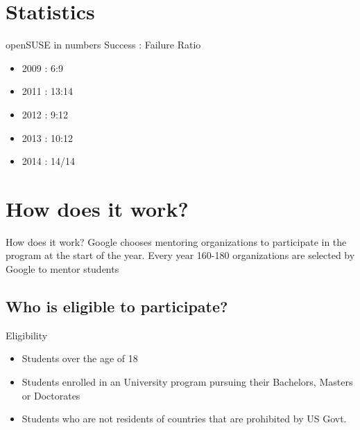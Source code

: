 \documentclass{beamer}
\begin{document}
\section{Statistics}
\begin{frame}{openSUSE in numbers}
Success : Failure Ratio
\begin{itemize}
\pause
\item 2009 : 6:9
\item 2011 : 13:14
\item 2012 : 9:12
\item 2013 : 10:12
\item 2014 : 14/14
\end{itemize}
\end{frame}

\section{How does it work?}
\begin{frame}{How does it work?}
\pause
Google chooses mentoring organizations to participate in the program at the start of the year. \pause Every year 160-180 organizations are selected by Google to mentor students
\end{frame}

\subsection{Who is eligible to participate?}
\begin{frame}{Eligibility}
\pause
\begin{itemize}
\item Students over the age of 18 \pause
\item Students enrolled in an University program pursuing their Bachelors, Masters or Doctorates \pause
\item Students who are not residents of countries that are prohibited by US Govt. 
\end{itemize}
\end{frame}
\end{document}

